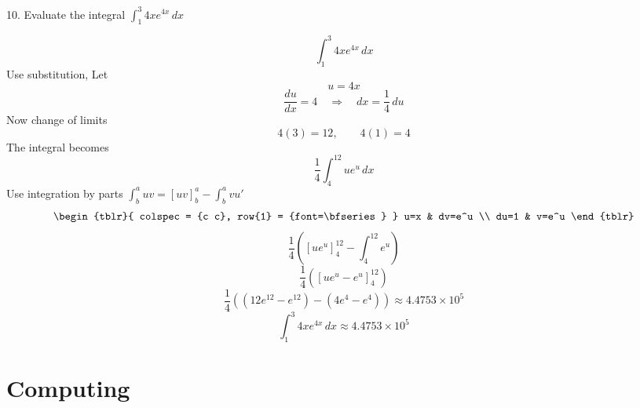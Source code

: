 \documentclass[a4paper, 12pt]{report}
\def\ni{green!60!black!40!white}
\begin{document}
    
    
    \newpage
    
    \begin{tcolorbox}[title={\color{black}\section{Q10}}, colback=white, colframe=\ni, boxrule=1mm, width=1\textwidth]
        10. Evaluate the integral \( \int_{1}^{3} 4x e^{4x} \, dx \)
    \end{tcolorbox}
       
    \[\int_{1}^{3} 4x e^{4x} \, dx\]
    Use substitution, Let
    \[u=4x\]
    \[\frac{du}{dx} = 4 \quad \Rightarrow \quad dx = \frac{1}{4} \, du\]
    Now change of limits
    \[4(3) = 12, \qquad 4(1)= 4\]
    The integral becomes
    \[\frac{1}{4}\int_{4}^{12} u e^{u} \, dx\]
    Use integration by parts $\int_{b}^{a} uv = [uv]_{b}^{a} - \int_{b}^{a} vu'$    
    \[
    \begin{tblr}{
            colspec = {c c},
            row{1} = {font=\bfseries}
        }
        u=x & dv=e^u \\
        du=1 & v=e^u
    \end{tblr}
    \]
    \[\frac{1}{4} \left([u e^{u}]_{4}^{12} - \int_{4}^{12} e^{u}\right)\]
    \[\frac{1}{4} \left([u e^{u}-e^{u}]_{4}^{12}\right)\]
    \[\frac{1}{4} \left(\left(12 e^{12}-e^{12}\right)-\left(4 e^{4}-e^{4}\right)\right)\approx 4.4753\times10^5\]
    \[\boxed{\int_{1}^{3} 4x e^{4x} \, dx \approx 4.4753\times10^5}\]
    
    \newpage
    \thispagestyle{empty}
    
    \chapter{Computing}
    
    \newpage\centering\restoregeometry
    
    \setcounter{page}{1}
    
    
\end{document}
